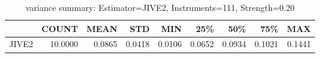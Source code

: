 \begin{table}[ht]
\centering
\caption{variance summary: Estimator=JIVE2, Instruments=111, Strength=0.20}
\begin{tabular}{lrrrrrrrr}
\toprule
 & COUNT & MEAN & STD & MIN & 25\% & 50\% & 75\% & MAX \\
\midrule
JIVE2 & 10.0000 & 0.0865 & 0.0418 & 0.0106 & 0.0652 & 0.0934 & 0.1021 & 0.1441 \\
\bottomrule
\end{tabular}
\end{table}
